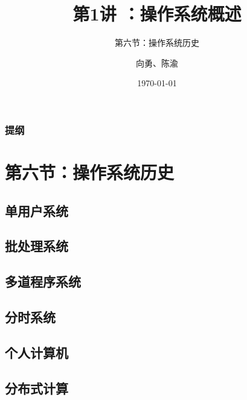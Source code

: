 \documentclass[UTF8]{ctexbeamer}
\title[第1讲]{第1讲 ：操作系统概述} %
\subtitle{第六节：操作系统历史}
\author{向勇、陈渝} %
\institute[清华大学] %
{
清华大学计算机系 \\ %
\medskip
\textit{xyong,yuchen@tsinghua.edu.cn} %
}
\date{\today} %
\begin{document}
\begin{frame}
\titlepage %
\end{frame}

\begin{frame}
\frametitle{提纲} %
\tableofcontents %
\end{frame}


\section{第六节：操作系统历史} %
\subsection{单用户系统}
\subsection{批处理系统}
\subsection{多道程序系统}
\subsection{分时系统}
\subsection{个人计算机}
\subsection{分布式计算}
\end{document}

